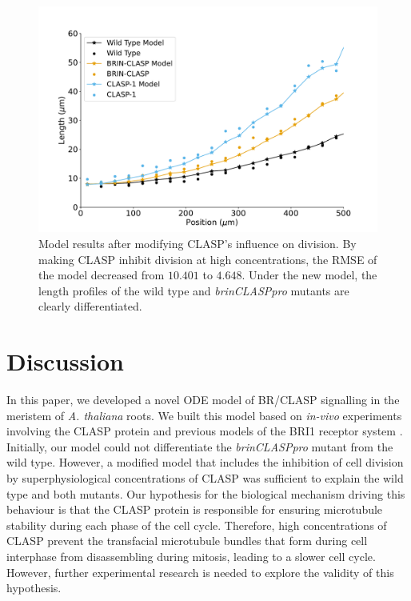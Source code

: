 \documentclass[referee,pdflatex,sn-mathphys-num]{sn-jnl}
\begin{document}
\begin{figure}
  \centering
  \includegraphics[width=\textwidth]{column-modified-fit.pdf}
  \caption{Model results after modifying CLASP's influence on division.
  By making CLASP inhibit division at high concentrations, the RMSE of the model decreased from $10.401$ to $4.648$.
Under the new model, the length profiles of the wild type and \emph{brinCLASPpro} mutants are clearly differentiated. }
  \label{column-modified-fit}
\end{figure}

 
\section{Discussion}\label{sec12}

In this paper, we developed a novel ODE model of BR/CLASP signalling in the meristem of \emph{A. thaliana} roots.
We built this model based on \emph{in-vivo} experiments involving the CLASP protein \cite{ambrose2011, ruan2018, halat2022} and previous models of the BRI1 receptor system \cite{vanesse2012}.
Initially, our model could not differentiate the \emph{brinCLASPpro} mutant from the wild type.
However, a modified model that includes the inhibition of cell division by superphysiological concentrations of CLASP was sufficient to explain the wild type and both mutants.
Our hypothesis for the biological mechanism driving this behaviour is that the CLASP protein is responsible for ensuring microtubule stability during each phase of the cell cycle.
Therefore, high concentrations of CLASP prevent the transfacial microtubule bundles that form during cell interphase from disassembling during mitosis, leading to a slower cell cycle.
However, further experimental research is needed to explore the validity of this hypothesis.
\end{document}
